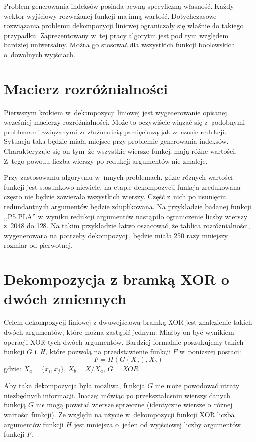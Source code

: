 Problem generowania indeksów posiada pewną specyficzną własność.
Każdy wektor wyjściowy rozważanej funkcji ma inną wartość.
Dotychczasowe rozwiązania problemu dekompozycji liniowej ograniczały się właśnie do takiego przypadku.
Zaprezentowany w~tej pracy algorytm jest pod tym względem bardziej uniwersalny.
Można go stosować dla wszystkich funkcji boolowskich o~dowolnych wyjściach.

\section{Macierz rozróżnialności}

Pierwszym krokiem w~dekompozycji liniowej jest wygenerowanie opisanej wcześniej macierzy rozróżnialności.
Może to oczywiście wiązać się z~podobnymi problemami związanymi ze złożonością pamięciową jak w~czasie redukcji.
Sytuacja taka będzie miała miejsce przy problemie generowania indeksów.
Charakteryzuje się on tym,
że wszystkie wiersze funkcji mają różne wartości.
Z~tego powodu liczba wierszy po redukcji argumentów nie zmaleje.

Przy zastosowaniu algorytmu w~innych problemach,
gdzie różnych wartości funkcji jest stosunkowo niewiele,
na etapie dekompozycji funkcja zredukowana często nie będzie zawierała wszystkich wierszy.
Część z~nich po usunięciu redundantnych argumentów będzie zduplikowana.
Na przykładzie badanej funkcji ,,P5.PLA'' w~wyniku redukcji argumentów nastąpiło ograniczenie liczby wierszy z~2048 do 128.
Na takim przykładzie łatwo oszacować,
że tablica rozróżnialności,
wygenerowana na potrzeby dekompozycji,
będzie miała 250 razy mniejszy rozmiar od pierwotnej.

\section{Dekompozycja z bramką XOR o dwóch zmiennych}
\label{section:single-decomposition}
Celem dekompozycji liniowej z dwuwejściową bramką XOR jest znalezienie takich dwóch argumentów,
które można zastąpić jednym.
Miałby on być wynikiem operacji XOR tych dwóch argumentów.
Bardziej formalnie poszukujemy takich funkcji $G$ i~$H$,
które pozwolą na przedstawienie funkcji $F$ w~poniższej postaci:
\begin{equation}
F = H( G ( X_a ), X_b)
\end{equation}
gdzie: $X_a = \{x_i, x_j\}$, $X_b = X / X_a$, $G = XOR$

Aby taka dekompozycja była możliwa,
funkcja $G$ nie może powodować utraty niezbędnych informacji.
Inaczej mówiąc po przekształceniu wierszy danych funkcją $G$ nie mogą powstać wiersze sprzeczne (identyczne wiersze o~różnej wartości funkcji).
Ze względu na użycie w~dekompozycji funkcji XOR liczba argumentów funkcji $H$ jest mniejsza o~jeden od wyjściowej liczby argumentów funkcji $F$.

